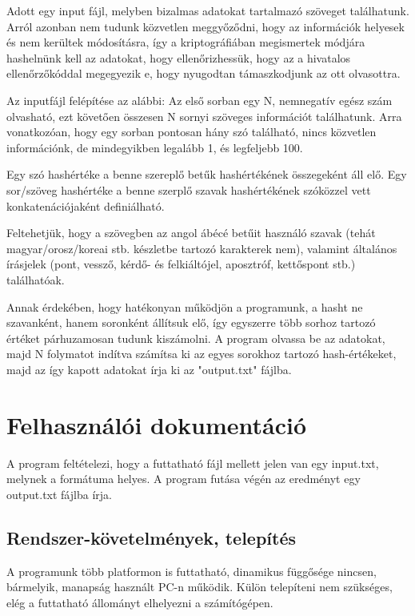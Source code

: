 \documentclass[12pt]{article}
\begin{document}
Adott egy input fájl, melyben bizalmas adatokat tartalmazó szöveget találhatunk. Arról azonban nem tudunk közvetlen meggyőződni, hogy az információk helyesek és nem kerültek módosításra, így a kriptográfiában megismertek módjára hashelnünk kell az adatokat, hogy ellenőrizhessük, hogy az a hivatalos ellenőrzőkóddal megegyezik e, hogy nyugodtan támaszkodjunk az ott olvasottra.

Az inputfájl felépítése az alábbi: Az első sorban egy N, nemnegatív egész szám olvasható, ezt követően összesen N sornyi szöveges információt találhatunk. Arra vonatkozóan, hogy egy sorban pontosan hány szó található, nincs közvetlen információnk, de mindegyikben legalább 1, és legfeljebb 100.

Egy szó hashértéke a benne szereplő betűk hashértékének összegeként áll elő. Egy sor/szöveg hashértéke a benne szerplő szavak hashértékének szóközzel vett konkatenációjaként definiálható.

Feltehetjük, hogy a szövegben az angol ábécé betűit használó szavak (tehát magyar/orosz/koreai stb. készletbe tartozó karakterek nem), valamint általános írásjelek (pont, vessző, kérdő- és felkiáltójel, aposztróf, kettőspont stb.) találhatóak.

Annak érdekében, hogy hatékonyan működjön a programunk, a hasht ne szavanként, hanem soronként állítsuk elő, így egyszerre több sorhoz tartozó értéket párhuzamosan tudunk kiszámolni. A program olvassa be az adatokat, majd N folymatot indítva számítsa ki az egyes sorokhoz tartozó hash-értékeket, majd az így kapott adatokat írja ki az "output.txt" fájlba.

\section{Felhasználói dokumentáció}

A program feltételezi, hogy a futtatható fájl mellett jelen van egy input.txt, melynek a formátuma helyes. A program futása végén az eredményt egy output.txt fájlba írja.

\subsection{Rendszer-követelmények, telepítés}

A programunk több platformon is futtatható, dinamikus függősége nincsen, bármelyik, manapság használt PC-n működik. Külön telepíteni nem szükséges, elég a futtatható állományt elhelyezni a számítógépen.
\end{document}
